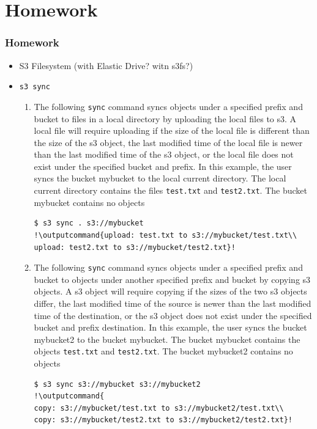 \documentclass{beamer}
\newcommand{\outputcommand}[1]{\color{darkgreen}{#1}}
\begin{document}
\section{Homework}
\begin{frame}
\frametitle{Homework}
\begin{itemize}
\item  S3 Filesystem (with Elastic Drive? witn s3fs?)
\item \texttt{s3 sync}
\begin{enumerate}
\item The following \texttt{sync} command syncs objects under a specified prefix and bucket to files in a local directory by uploading the local files to \acrshort{s3}. A local file will require uploading if the size of the local file is different than the size of the \acrshort{s3} object, the last modified time of the local file is newer than the last modified time of the \acrshort{s3} object, or the local file does not exist under the specified bucket and prefix. In this example, the user syncs the bucket mybucket to the local current directory. The local current directory contains the files \texttt{test.txt} and \texttt{test2.txt}. The bucket mybucket contains no objects

\lstset{language=shell}
\begin{lstlisting}[escapechar=!]
$ s3 sync . s3://mybucket
!\outputcommand{upload: test.txt to s3://mybucket/test.txt\\
upload: test2.txt to s3://mybucket/test2.txt}!
\end{lstlisting}

\item The following \texttt{sync} command syncs objects under a specified prefix and bucket to objects under another specified prefix and bucket by copying \acrshort{s3} objects. A \acrshort{s3} object will require copying if the sizes of the two \acrshort{s3} objects differ, the last modified time of the source is newer than the last modified time of the destination, or the \acrshort{s3} object does not exist under the specified bucket and prefix destination. In this example, the user syncs the bucket mybucket2 to the bucket mybucket. The bucket mybucket contains the objects \texttt{test.txt} and \texttt{test2.txt}. The bucket mybucket2 contains no objects

\lstset{language=shell}
\begin{lstlisting}[escapechar=!]
$ s3 sync s3://mybucket s3://mybucket2
!\outputcommand{
copy: s3://mybucket/test.txt to s3://mybucket2/test.txt\\
copy: s3://mybucket/test2.txt to s3://mybucket2/test2.txt}!
\end{lstlisting}



\end{enumerate}
\end{itemize}
\end{frame}
\end{document}
